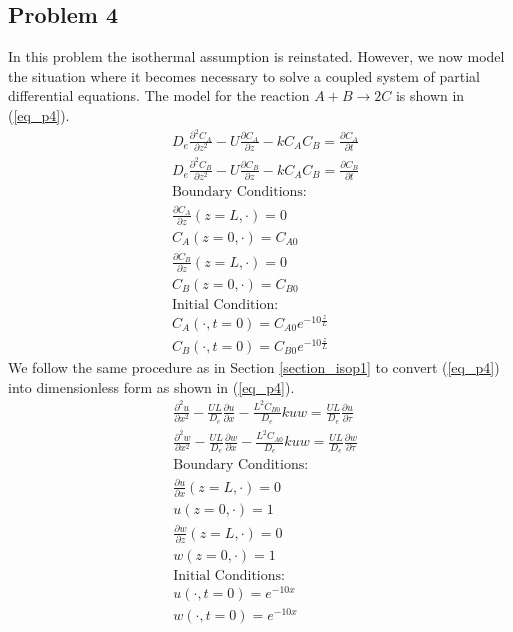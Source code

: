 \documentclass[11pt,fleqn]{article}
\theoremstyle{defstyle}
\begin{document}
\subsection{Problem 4}
In this problem the isothermal assumption is reinstated. However, we now model the situation where it becomes necessary to solve a coupled system of partial differential equations. The model for the reaction $A + B \rightarrow 2C$ is shown in (\ref{eq_p4}). 
\begin{equation}
\begin{aligned}
&D_e \frac{\partial^2 C_A}{\partial z^2} - U \frac{\partial C_A}{\partial z} - kC_AC_B 
= \frac{\partial C_A}{\partial t} \\
&D_e \frac{\partial^2 C_B}{\partial z^2} - U \frac{\partial C_B}{\partial z} - kC_AC_B 
= \frac{\partial C_B}{\partial t} \\
&\text{Boundary Conditions:} \\
&\frac{\partial C_A}{\partial z}(z=L, \cdot) = 0\\
&C_A(z=0, \cdot) = C_{A0} \\
&\frac{\partial C_B}{\partial z}(z=L, \cdot) = 0\\
&C_B(z=0, \cdot) = C_{B0} \\
&\text{Initial Condition:} \\
& C_A(\cdot, t= 0) = C_{A0}e^{-10\frac{z}{L}} \\
& C_B(\cdot, t= 0) = C_{B0}e^{-10\frac{z}{L}}
\end{aligned}
\label{eq_p4}
\end{equation}
We follow the same procedure as in Section \ref{section_isop1} to convert (\ref{eq_p4}) into dimensionless form as shown in (\ref{eq_p4}).
\begin{equation}
\begin{aligned}
&\frac{\partial^2 u}{\partial x^2} - \frac{UL}{D_e} \frac{\partial u}{\partial x} - \frac{L^2C_{B0}}{D_e}kuw 
= \frac{UL}{D_e}\frac{\partial u}{\partial \tau} \\
&\frac{\partial^2 w}{\partial x^2} - \frac{UL}{D_e} \frac{\partial w}{\partial x} - \frac{L^2C_{A0}}{D_e}kuw 
= \frac{UL}{D_e}\frac{\partial w}{\partial \tau} \\
&\text{Boundary Conditions:} \\
&\frac{\partial u}{\partial x}(z=L, \cdot) = 0\\
&u(z=0, \cdot) = 1 \\
&\frac{\partial w}{\partial z}(z=L, \cdot) = 0\\
&w(z=0, \cdot) = 1 \\
&\text{Initial Conditions:} \\
& u(\cdot, t= 0) = e^{-10x} \\
& w(\cdot, t= 0) = e^{-10x}
\end{aligned}
\label{eq_p4d}
\end{equation}
\end{document}
